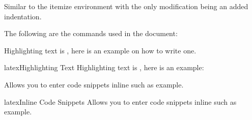 \documentclass[minted, draw, cover = contour]{../tex/hebdomon}
\begin{document}
\begin{hgitemize}
	\item[\pcode{Hgitemize}] Similar to the itemize environment with the only modification
	being an added indentation.
\end{hgitemize}


The following are the commands used in the document:

\begin{hgitemize}
	\item[\pcode{hlight}] Highlighting text is , here is an example on how to write one.
\end{hgitemize}

\begin{Code}{latex}{Highlighting Text}
	Highlighting text is , here is an example:
\end{Code}

\begin{hgitemize}
	\item[\pcode{pcode}] Allows you to enter code snippets inline such as  example.
\end{hgitemize}

\begin{Code}{latex}{Inline Code Snippets}
	Allows you to enter code snippets inline such as  example.
\end{Code}
\end{document}
